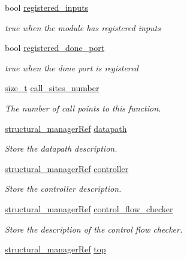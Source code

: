 \begin{DoxyCompactItemize}
bool \hyperlink{classhls_a971fc57c719e998d35487786bf705edf}{registered\+\_\+inputs}
\begin{DoxyCompactList}\small\item\em true when the module has registered inputs \end{DoxyCompactList}\item 
bool \hyperlink{classhls_a729d30e5819cf147e13aa42eda07659f}{registered\+\_\+done\+\_\+port}
\begin{DoxyCompactList}\small\item\em true when the done port is registered \end{DoxyCompactList}\item 
\hyperlink{tutorial__fpt__2017_2intro_2sixth_2test_8c_a7c94ea6f8948649f8d181ae55911eeaf}{size\+\_\+t} \hyperlink{classhls_a6ea7350c251d688a3c6aa291e4f6ed73}{call\+\_\+sites\+\_\+number}
\begin{DoxyCompactList}\small\item\em The number of call points to this function. \end{DoxyCompactList}\item 
\hyperlink{structural__manager_8hpp_ab3136f0e785d8535f8d252a7b53db5b5}{structural\+\_\+manager\+Ref} \hyperlink{classhls_aa93c9c2ca7dbf225231a593300dd459a}{datapath}
\begin{DoxyCompactList}\small\item\em Store the datapath description. \end{DoxyCompactList}\item 
\hyperlink{structural__manager_8hpp_ab3136f0e785d8535f8d252a7b53db5b5}{structural\+\_\+manager\+Ref} \hyperlink{classhls_a48cb5a4df024d43eabe08db9a90b1ffd}{controller}
\begin{DoxyCompactList}\small\item\em Store the controller description. \end{DoxyCompactList}\item 
\hyperlink{structural__manager_8hpp_ab3136f0e785d8535f8d252a7b53db5b5}{structural\+\_\+manager\+Ref} \hyperlink{classhls_aff2527283e4877a38dbf1f071127caff}{control\+\_\+flow\+\_\+checker}
\begin{DoxyCompactList}\small\item\em Store the description of the control flow checker. \end{DoxyCompactList}\item 
\hyperlink{structural__manager_8hpp_ab3136f0e785d8535f8d252a7b53db5b5}{structural\+\_\+manager\+Ref} \hyperlink{classhls_af714c4c35f2a225f8b5a7b02a67f278f}{top}

\end{DoxyCompactItemize}
